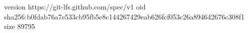 version https://git-lfs.github.com/spec/v1
oid sha256:b0fdab76a7e533cb95fb5e8c144267429eab626fcf053c26a894642676c308f1
size 89795
